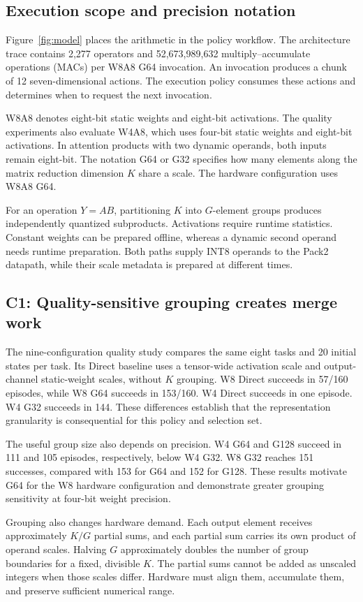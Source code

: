 \documentclass[journal,10pt]{IEEEtran}
\begin{document}
\subsection{Execution scope and precision notation}
Figure~\ref{fig:model} places the arithmetic in the policy workflow. The architecture trace contains 2,277 operators and 52,673,989,632 multiply--accumulate operations (MACs) per W8A8 G64 invocation. An invocation produces a chunk of 12 seven-dimensional actions. The execution policy consumes these actions and determines when to request the next invocation.

W8A8 denotes eight-bit static weights and eight-bit activations. The quality experiments also evaluate W4A8, which uses four-bit static weights and eight-bit activations. In attention products with two dynamic operands, both inputs remain eight-bit. The notation G64 or G32 specifies how many elements along the matrix reduction dimension $K$ share a scale. The hardware configuration uses W8A8 G64.

For an operation $Y=AB$, partitioning $K$ into $G$-element groups produces independently quantized subproducts. Activations require runtime statistics. Constant weights can be prepared offline, whereas a dynamic second operand needs runtime preparation. Both paths supply INT8 operands to the Pack2 datapath, while their scale metadata is prepared at different times.

\subsection{C1: Quality-sensitive grouping creates merge work}
The nine-configuration quality study compares the same eight tasks and 20 initial states per task. Its Direct baseline uses a tensor-wide activation scale and output-channel static-weight scales, without $K$ grouping. W8 Direct succeeds in 57/160 episodes, while W8 G64 succeeds in 153/160. W4 Direct succeeds in one episode. W4 G32 succeeds in 144. These differences establish that the representation granularity is consequential for this policy and selection set.

The useful group size also depends on precision. W4 G64 and G128 succeed in 111 and 105 episodes, respectively, below W4 G32. W8 G32 reaches 151 successes, compared with 153 for G64 and 152 for G128. These results motivate G64 for the W8 hardware configuration and demonstrate greater grouping sensitivity at four-bit weight precision.

Grouping also changes hardware demand. Each output element receives approximately $K/G$ partial sums, and each partial sum carries its own product of operand scales. Halving $G$ approximately doubles the number of group boundaries for a fixed, divisible $K$. The partial sums cannot be added as unscaled integers when those scales differ. Hardware must align them, accumulate them, and preserve sufficient numerical range.
\end{document}
